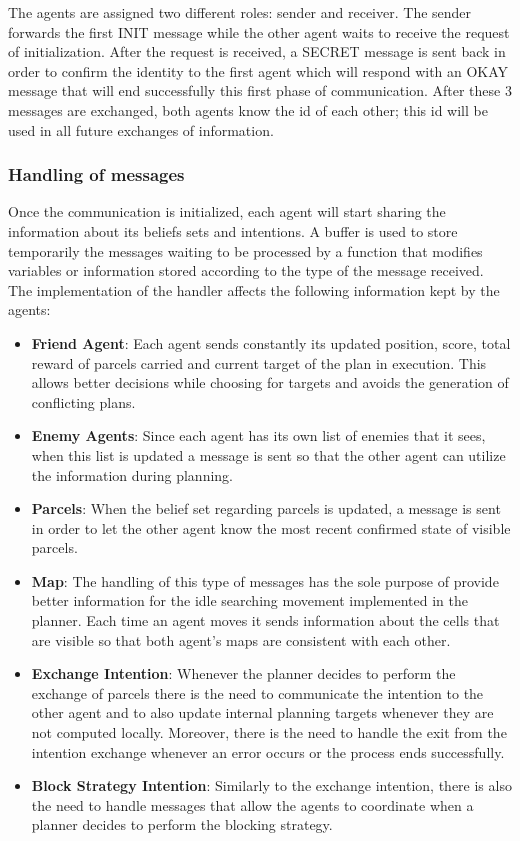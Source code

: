 \documentclass[a4paper, 11pt]{article}
\begin{document}
The agents are assigned two different roles: sender and receiver. The sender forwards the first INIT message while the other agent waits to receive the request of initialization. After the request is received, a SECRET message is sent back in order to confirm the identity to the first agent which will respond with an OKAY message that will end successfully this first phase of communication. After these 3 messages are exchanged, both agents know the id of each other; this id will be used in all future exchanges of information.

\subsubsection{Handling of messages}
Once the communication is initialized, each agent will start sharing the information about its beliefs sets and intentions. A buffer is used to store temporarily the messages waiting to be processed by a function that modifies variables or information stored according to the type of the message received. The implementation of the handler affects the following information kept by the agents:
\begin{itemize}
\item \textbf{Friend Agent}: Each agent sends constantly its updated position, score, total reward of parcels carried and current target of the plan in execution. This allows better decisions while choosing for targets and avoids the generation of conflicting plans.
\item \textbf{Enemy Agents}: Since each agent has its own list of enemies that it sees, when this list is updated a message is sent so that the other agent can utilize the information during planning.
\item \textbf{Parcels}: When the belief set regarding parcels is updated, a message is sent in order to let the other agent know the most recent confirmed state of visible parcels.
\item \textbf{Map}: The handling of this type of messages has the sole purpose of provide better information for the idle searching movement implemented in the planner. Each time an agent moves it sends information about the cells that are visible so that both agent's maps are consistent with each other.
\item \textbf{Exchange Intention}: Whenever the planner decides to perform the exchange of parcels there is the need to communicate the intention to the other agent and to also update internal planning targets whenever they are not computed locally. Moreover, there is the need to handle the exit from the intention exchange whenever an error occurs or the process ends successfully.
\item \textbf{Block Strategy Intention}: Similarly to the exchange intention, there is also the need to handle messages that allow the agents to coordinate when a planner decides to perform the blocking strategy.
\end{itemize}
\end{document}
